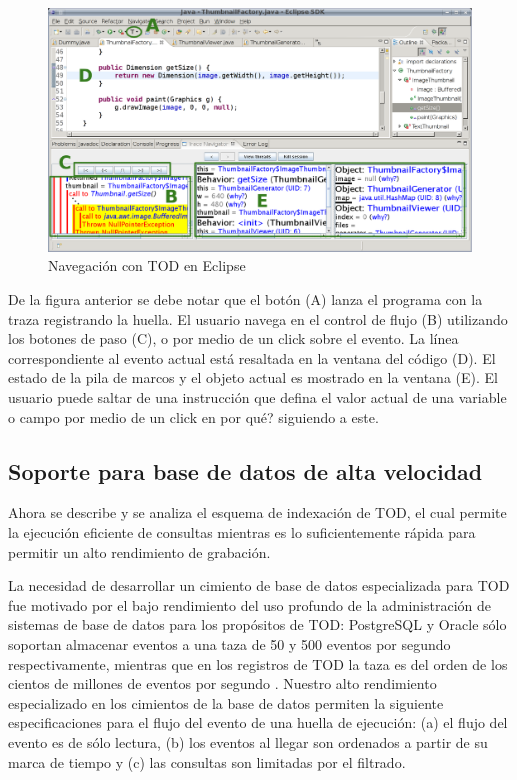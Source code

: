 \documentclass[12pt,legalpaper]{report}
\begin{document}
\begin{figure}[hpb]
	\centering
	\includegraphics[scale=0.3]{images/TOD/ScreenShotCFlow.eps}
	\caption{Navegación con TOD en Eclipse}
	\label{screenShotCFlow}
\end{figure}

De la figura anterior se debe notar que el botón (A) lanza el programa con la traza registrando la huella.  El usuario navega en el control de flujo (B) utilizando los botones de paso (C), o por medio de un click sobre el evento.  La línea correspondiente al evento actual está resaltada en la ventana del código (D).  El estado de la pila de marcos y el objeto actual es mostrado en la ventana (E).  El usuario puede saltar de una instrucción que defina el valor actual de una variable o campo por medio de un click en por qué? siguiendo a este.


		\subsection{Soporte para base de datos de alta velocidad}

Ahora se describe y se analiza el esquema de indexación de TOD, el cual permite la ejecución eficiente de consultas mientras es lo suficientemente rápida para permitir un alto rendimiento de grabación.

La necesidad de desarrollar un cimiento de base de datos especializada para TOD fue motivado por el bajo rendimiento del uso profundo de la administración de sistemas de base de datos para los propósitos de TOD: PostgreSQL y Oracle sólo soportan almacenar eventos a una taza de 50 y 500 eventos por segundo respectivamente, mientras que en los registros de TOD la taza es del orden de los cientos de millones de eventos por segundo \cite{cots}.  Nuestro alto rendimiento especializado en los cimientos de la base de datos permiten la siguiente especificaciones para el flujo del evento de una huella de ejecución: (a) el flujo del evento es de sólo lectura, (b) los eventos al llegar son ordenados a partir de su marca de tiempo y (c) las consultas son limitadas por el filtrado.
\end{document}
